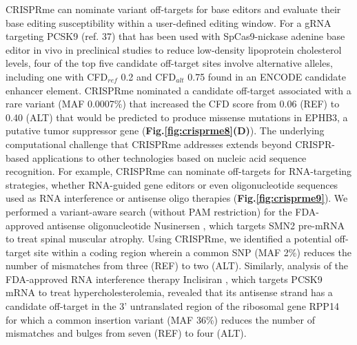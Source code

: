\documentclass[a4paper, titlepage, openright]{book}
\newcommand{\crisprme}{CRISPRme\xspace}
\begin{document}
\crisprme can nominate variant off-targets for base editors and evaluate their base editing susceptibility within a user-defined editing window. For a gRNA targeting PCSK9 (ref. 37) that has been used with SpCas9-nickase adenine base editor in vivo in preclinical studies to reduce low-density lipoprotein cholesterol levels, four of the top five candidate off-target sites involve alternative alleles, including one with CFD$_{ref}$ 0.2 and CFD$_{alt}$ 0.75 found in an ENCODE candidate enhancer element. \crisprme nominated a candidate off-target associated with a rare variant (MAF 0.0007\%) that increased the CFD score from 0.06 (REF) to 0.40 (ALT) that would be predicted to produce missense mutations in EPHB3, a putative tumor suppressor gene (\textbf{Fig.\ref{fig:crisprme8}(D)}). The underlying computational challenge that \crisprme addresses extends beyond CRISPR-based applications to other technologies based on nucleic acid sequence recognition. For example, \crisprme can nominate off-targets for RNA-targeting strategies, whether RNA-guided gene editors or even oligonucleotide sequences used as RNA interference or antisense oligo therapies (\textbf{Fig.\ref{fig:crisprme9}}). We performed a variant-aware search (without PAM restriction) for the FDA-approved antisense oligonucleotide Nusinersen \citep{finkel2017nusinersen, mercuri2018nusinersen}, which targets SMN2 pre-mRNA to treat spinal muscular atrophy. Using \crisprme, we identified a potential off-target site within a coding region wherein a common SNP (MAF 2\%) reduces the number of mismatches from three (REF) to two (ALT). Similarly, analysis of the FDA-approved RNA interference therapy Inclisiran \citep{raal2020inclisiran}, which targets PCSK9 mRNA to treat hypercholesterolemia, revealed that its antisense strand has a candidate off-target in the 3' untranslated region of the ribosomal gene RPP14 for which a common insertion variant (MAF 36\%) reduces the number of mismatches and bulges from seven (REF) to four (ALT).
\end{document}
